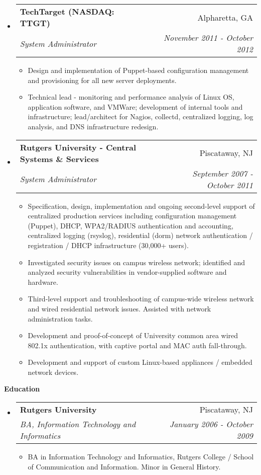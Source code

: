 \documentclass[letterpaper,11pt]{article}
\makeatletter
\newcommand{\resitem}[1]{\item #1 \vspace{-2pt}}
\newcommand{\resheading}[1]{{\large \colorbox{mygrey}{\begin{minipage}{\textwidth}{\textbf{#1 \vphantom{p\^{E}}}}\end{minipage}}}}
\newcommand{\ressubheading}[4]{
\begin{tabular*}{7.0in}{l@{\extracolsep{\fill}}r}
		\textbf{#1} & #2 \\
		\textit{#3} & \textit{#4} \\
\end{tabular*}\vspace{-6pt}}
\makeatother
\begin{document}
\begin{itemize}
\item
	\ressubheading{TechTarget  (NASDAQ: TTGT)}{Alpharetta, GA}{System Administrator}{November 2011 - October 2012}
	\begin{itemize}
		            \resitem{Design and implementation of Puppet-based configuration management and provisioning for all new server deployments.}
                \resitem{Technical lead - monitoring and performance analysis of Linux OS, application software, and VMWare; development of internal tools and infrastructure; lead/architect for Nagios, collectd, centralized logging, log analysis, and DNS infrastructure redesign.}
	\end{itemize}
\item
	\ressubheading{Rutgers University - Central Systems \& Services}{Piscataway, NJ}{System Administrator}{September 2007 - October 2011}
	\begin{itemize}
                \resitem{Specification, design, implementation and ongoing second-level support of centralized production services including configuration management (Puppet), DHCP, WPA2/RADIUS authentication and accounting, centralized logging (rsyslog), residential (dorm) network authentication / registration / DHCP infrastructure (30,000+ users).}
                \resitem{Investigated security issues on campus wireless network; identified and analyzed security vulnerabilities in vendor-supplied software and hardware.}
                \resitem{Third-level support and troubleshooting of campus-wide wireless network and wired residential network issues. Assisted with network administration tasks.}
		            \resitem{Development and proof-of-concept of University common area wired 802.1x authentication, with captive portal and MAC auth fall-through.}
		            \resitem{Development and support of custom Linux-based appliances / embedded network devices.}
	\end{itemize}

\end{itemize}

\resheading{Education}
\begin{itemize}
\item
	\ressubheading{Rutgers University}{Piscataway, NJ}{BA, Information Technology and Informatics}{January 2006 - October 2009}
	\begin{itemize}
		\resitem{BA in Information Technology and Informatics, Rutgers
                College / School of Communication and Information. Minor in
                General History.}
	\end{itemize}
\end{itemize}
\end{document}
